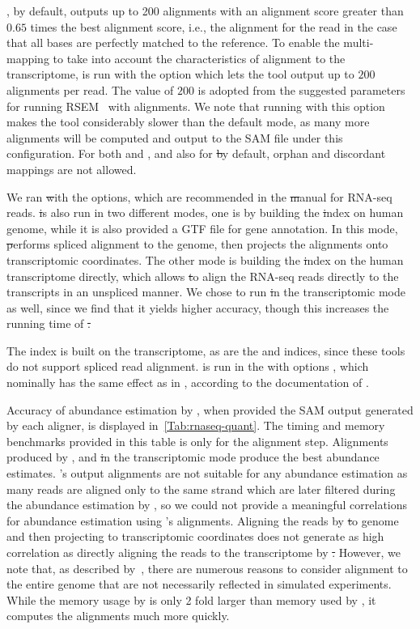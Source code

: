 \puffaligner, by default, outputs up to 200 alignments with an alignment score greater than $0.65$ times the 
best alignment score, i.e., the alignment for the read in the case that all bases are perfectly matched to the 
reference.
To enable the multi-mapping to take into account the characteristics of alignment to the transcriptome,
\bt is run with the option  which lets the tool output up to $200$ alignments per read. The 
value of $200$ is adopted from the suggested parameters for running RSEM~\citep{rsem} with \bt alignments. 
We note that running \bt with this option makes the tool considerably slower than the default mode, as many 
more alignments will be computed and output to the SAM file under this configuration.
For both \bt and \puffaligner, and also for \st by default, orphan and discordant mappings are not allowed.

We ran \st with the  options, which are recommended in the \st manual for RNA-seq reads.
\st is also run in two different modes, one is by building the \st index on human genome, while it is also 
provided a GTF file for gene annotation. In this mode, \st performs spliced alignment to the genome, then 
projects the alignments onto transcriptomic coordinates. The other mode is building the \st index on the 
human transcriptome directly, which allows \st to align the RNA-seq reads directly to the transcripts in an 
unspliced manner. We chose to run \st in the transcriptomic mode as well, since we find that it yields higher 
accuracy, though this increases the running time of \st.

The \debga index is built on the transcriptome, as are the \bt and \puffaligner indices, since these tools 
do not support spliced read alignment. \debga is run in the with options , which nominally 
has the same effect as  in \bt, according to the documentation of \debga.

Accuracy of abundance estimation by \salmon, when provided the SAM output generated by each aligner, is 
displayed in~\cref{Tab:rnaseq-quant}. The timing and memory benchmarks provided in this table is only for the 
alignment step. Alignments produced by \puffaligner, \bt and \st in the transcriptomic mode produce the best 
abundance estimates. \debga's output alignments are not suitable for any abundance estimation as many reads 
are aligned only to the same strand which are later filtered during the abundance estimation by \salmon, so 
we could not provide a meaningful correlations for abundance estimation using \debga's alignments.
Aligning the reads by \st to genome and then projecting to transcriptomic coordinates does not generate as 
high correlation as directly aligning the reads to the transcriptome by \st.  However, we note that, as 
described by~\citet{srivastava2019alignment}, there are numerous reasons to consider alignment to the 
entire genome that are not necessarily reflected in simulated experiments.
While the memory usage by \puffaligner is only 2 fold larger than memory used by \bt, it computes the 
alignments much more quickly. 

